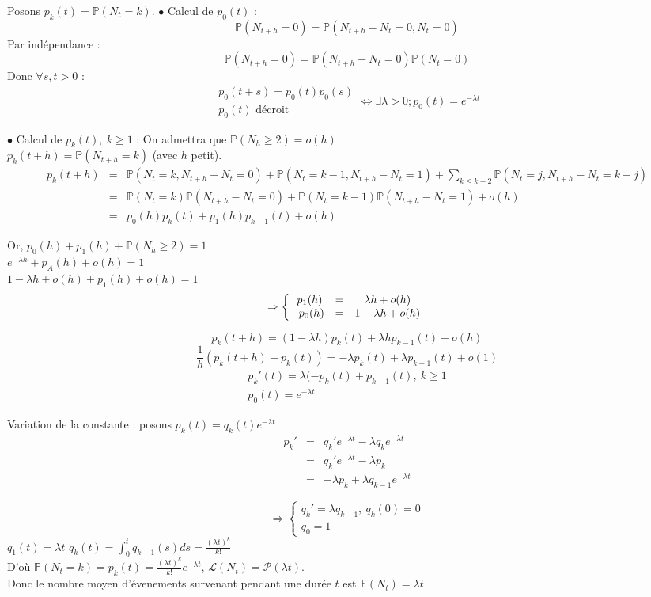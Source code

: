 \begin{dem}
Posons $p_k(t)=\mathbb{P}(N_t=k)$.
$\bullet$ Calcul de $p_0(t)$ :
	\[\mathbb{P}(N_{t+h}=0)=\mathbb{P}(N_{t+h}-N_t=0,N_t=0)\]
Par indépendance :
	\[\mathbb{P}(N_{t+h}=0)=\mathbb{P}(N_{t+h}-N_t=0)\mathbb{P}(N_t=0)\]
Donc $\forall s,t>0$ :
	\[\begin{array}{c} p_0(t+s)=p_0(t)p_0(s) \\ p_0(t) \text{ décroit} \end{array}\Leftrightarrow \exists \lambda>0; p_0(t)=e^{-\lambda t}\]

\bigskip
$\bullet$ Calcul de $p_k(t),\ k\geq 1$ :
On admettra que $\mathbb{P}(N_h\geq 2)=o(h)$\\
$p_k(t+h)=\mathbb{P}(N_{t+h}=k)$ (avec $h$ petit).
\begin{eqnarray*}
p_k(t+h)&=&\mathbb{P}(N_t=k,N_{t+h}-N_t=0)+\mathbb{P}(N_t=k-1,N_{t+h}-N_t=1)+\sum_{k\leq k-2} \mathbb{P}(N_t=j,N_{t+h}-N_t=k-j)\\
	&=&\mathbb{P}(N_t=k)\mathbb{P}(N_{t+h}-N_t=0)+\mathbb{P}(N_t=k-1)\mathbb{P}(N_{t+h}-N_t=1)+o(h)\\
	&=&p_0(h)p_k(t)+p_1(h)p_{k-1}(t)+o(h)
\end{eqnarray*}

Or, $p_0(h)+p_1(h)+\mathbb{P}(N_h\geq 2)=1$\\
$e^{-\lambda h}+p_A(h)+o(h)=1$\\
$1-\lambda h+o(h)+p_1(h)+o(h)=1$
\[\Rightarrow \left\{\begin{array}{c c c} p_1(h)&=&\lambda h+o(h) \\ p_0(h)&=&1-\lambda h+o(h) \end{array}\right.\]

\[p_k(t+h)=(1-\lambda h)p_k(t)+\lambda hp_{k-1}(t)+o(h)\]
\[\frac{1}{h}\left( p_k(t+h)-p_k(t)\right)=-\lambda p_k(t)+\lambda p_{k-1}(t)+o(1)\]
\[\begin{array}{c} p_k'(t)=\lambda(-p_k(t)+p_{k-1}(t),\ k\geq 1\\ p_0(t)=e^{-\lambda t} \end{array}\]

Variation de la constante : posons $p_k(t)=q_k(t)e^{-\lambda t}$
\begin{eqnarray*}
	p_k'&=&q_k'e^{-\lambda t}-\lambda q_ke^{-\lambda t} \\
		&=&q_k'e^{-\lambda t}-\lambda p_k \\
		&=&-\lambda p_k+\lambda q_{k-1}e^{-\lambda t}
\end{eqnarray*}

\[\Rightarrow \left\{ \begin{array}{c} q_k'=\lambda q_{k-1},\ q_k(0)=0 \\ q_0=1 \end{array}\right.\]
$q_1(t)=\lambda t$
$q_k(t)=\int_0^t q_{k-1}(s) ds = \frac{(\lambda t)^k}{k!}$ \\
D'où $\mathbb{P}(N_t=k)=p_k(t)=\frac{(\lambda t)^k}{k!}e^{-\lambda t}$, $\mathcal{L}(N_t)=\mathcal{P}(\lambda t)$.\\
Donc le nombre moyen d'évenements survenant pendant une durée $t$ est $\mathbb{E}(N_t)=\lambda t$
\end{dem}

